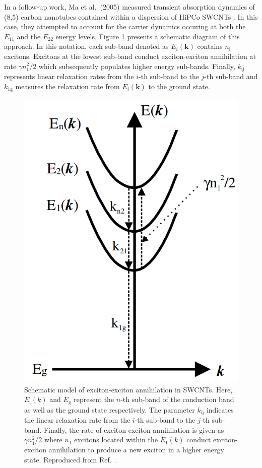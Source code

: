In a follow-up work, Ma et al.\ (2005) measured transient absorption dynamics of (8,5) carbon nanotubes contained within a dispersion of HiPCo SWCNTs \cite{ma2005femtosecond}. In this case, they attempted to account for the carrier dynamics occuring at both the $E_{11}$ and the $E_{22}$ energy levels. Figure \ref{fig:exciton_schematic_ma} presents a schematic diagram of this approach. In this notation, each sub-band denoted as $E_i(\mathbf{k})$ contains $n_\text{i}$ excitons. Excitons at the lowest sub-band conduct exciton-exciton annihilation at rate $\gamma n_1^2/2$ which subsequently populates higher energy sub-bands. Finally, $k_\text{ij}$ represents linear relaxation rates from the $i$-th sub-band to the $j$-th sub-band and $k_\text{1g}$ measures the relaxation rate from $E_i(\mathbf{k})$ to the ground state.

\begin{figure}[ht]
	\centering
	\includegraphics[scale=0.3]{images/chapter_prior_works/exciton_schematic_ma_2005}
	\caption{Schematic model of exciton-exciton annihilation in SWCNTs. Here, $E_\text{i}(k)$ and $E_\text{g}$ represent the $n$-th sub-band of the conduction band as well as the ground state respectively. The parameter $k_\text{ij}$ indicates the linear relaxation rate from the $i$-th sub-band to the $j$-th sub-band. Finally, the rate of exciton-exciton annihilation is given as $\gamma n_1^2/2$ where  $n_1$ excitons located within the $E_1(k)$ conduct exciton-exciton annihilation to produce a new exciton in a higher energy state. Reproduced from Ref.\ \cite{ma2005femtosecond}.}
	\label{fig:exciton_schematic_ma}
\end{figure}

